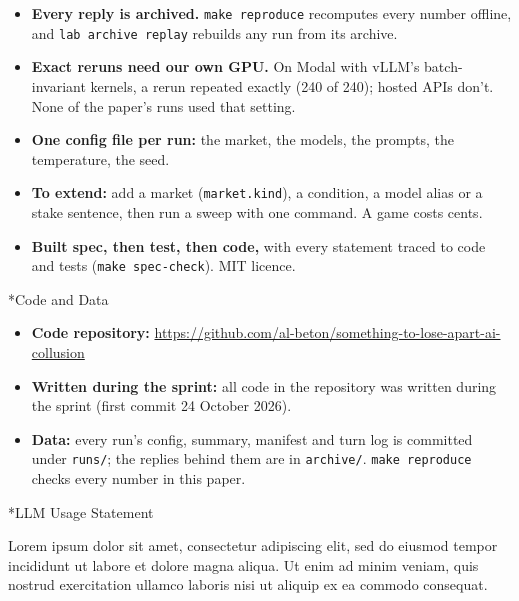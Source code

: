 \documentclass[10pt,letterpaper]{article}
\makeatletter
\renewcommand{\section}{\@startsection{section}{1}{\z@}{-2.0ex \@plus -0.5ex \@minus -0.2ex}{1.5ex \@plus 0.3ex \@minus 0.2ex}{\large\bfseries\raggedright}}
\providecommand{\tightlist}{\setlength{\itemsep}{0pt}\setlength{\parskip}{0pt}}
\makeatother
\begin{document}
\begin{itemize}
\tightlist
\item
  \textbf{Every reply is archived.} \texttt{make\ reproduce} recomputes
  every number offline, and \texttt{lab\ archive\ replay} rebuilds any
  run from its archive.
\item
  \textbf{Exact reruns need our own GPU.} On Modal with vLLM's
  batch-invariant kernels, a rerun repeated exactly (240 of 240); hosted
  APIs don't. None of the paper's runs used that setting.
\item
  \textbf{One config file per run:} the market, the models, the prompts,
  the temperature, the seed.
\item
  \textbf{To extend:} add a market (\texttt{market.kind}), a condition,
  a model alias or a stake sentence, then run a sweep with one command.
  A game costs cents.
\item
  \textbf{Built spec, then test, then code,} with every statement traced
  to code and tests (\texttt{make\ spec-check}). MIT licence.
\end{itemize}

\section*{Code and Data}\label{code-and-data}

\begin{itemize}
\tightlist
\item
  \textbf{Code repository:}
  \url{https://github.com/al-beton/something-to-lose-apart-ai-collusion}
\item
  \textbf{Written during the sprint:} all code in the repository was
  written during the sprint (first commit 24 October 2026).
\item
  \textbf{Data:} every run's config, summary, manifest and turn log is
  committed under \texttt{runs/}; the replies behind them are in
  \texttt{archive/}. \texttt{make\ reproduce} checks every number in
  this paper.
\end{itemize}

\section*{LLM Usage Statement}\label{llm-usage-statement}

Lorem ipsum dolor sit amet, consectetur adipiscing elit, sed do eiusmod
tempor incididunt ut labore et dolore magna aliqua. Ut enim ad minim
veniam, quis nostrud exercitation ullamco laboris nisi ut aliquip ex ea
commodo consequat.
\end{document}
